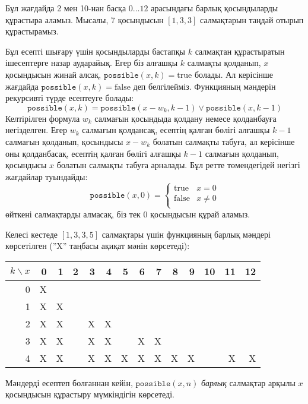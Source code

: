 Бұл жағдайда 2 мен 10-нан басқа $0 \ldots 12$ арасындағы
барлық қосындыларды құрастыра аламыз. 
Мысалы, 7 қосындысын $[1,3,3]$ салмақтарын 
таңдай отырып құрастырамыз.

Бұл есепті шығару үшін қосындыларды
бастапқы $k$ салмақтан құрастыратын 
ішесептерге назар аударайық.
Егер біз алғашқы $k$ салмақты
қолданып, $x$ қосындысын жинай алсақ, $\texttt{possible}(x,k)=\textrm{true}$ болады. Ал керісінше жағдайда $\texttt{possible}(x,k)=\textrm{false}$ деп
белгілейміз.
Функцияның мәндерін рекурсивті түрде
есептеуге болады:
\[ \texttt{possible}(x,k) = \texttt{possible}(x-w_k,k-1) \lor \texttt{possible}(x,k-1) \]
Келтірілген формула $w_k$ салмағын қосындыда қолдану немесе
қолданбауға негізделген. 
Егер $w_k$ салмағын қолдансақ, есептің қалған бөлігі алғашқы $k-1$ салмағын қолданып, қосындысы $x-w_k$
болатын салмақты табуға, ал 
керісінше оны қолданбасақ, есептің қалған бөлігі 
алғашқы $k-1$ салмағын қолданып, қосындысы $x$
болатын салмақты табуға арналады. 
Бұл ретте төмендегідей негізгі жағдайлар туындайды:
\begin{equation*}
    \texttt{possible}(x,0) = \begin{cases}
               \textrm{true}    & x = 0\\
               \textrm{false}   & x \neq 0 \\
           \end{cases}
\end{equation*}
өйткені салмақтарды алмасақ, 
біз тек 0 қосындысын құрай аламыз.

Келесі кестеде $[1,3,3,5]$ салмақтары 
үшін функцияның барлық мәндері көрсетілген (''X'' таңбасы
ақиқат мәнін көрсетеді):

\begin{center}
\begin{tabular}{r|rrrrrrrrrrrrr}
$k \backslash x$ & 0 & 1 & 2 & 3 & 4 & 5 & 6 & 7 & 8 & 9 & 10 & 11 & 12 \\
\hline
 0 & X & \\
 1 & X & X \\
 2 & X & X & & X & X \\
 3 & X & X & & X & X & & X & X \\
 4 & X & X & & X & X & X & X & X & X & X & & X & X \\
\end{tabular}
\end{center}

Мәндерді есептеп болғаннан кейін, $\texttt{possible}(x,n)$
\emph{барлық} салмақтар арқылы $x$ қосындысын құрастыру 
мүмкіндігін көрсетеді. 

